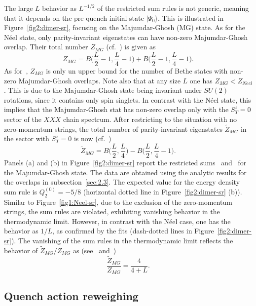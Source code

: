 \documentclass[11pt]{iopart}
\begin{document}
The large $L$ behavior as $L^{-1/2}$  of the restricted sum 
rules is not generic, meaning that it depends on the pre-quench initial state $|\Psi_0
\rangle$. This is illustrated in Figure~\ref{fig2:dimer-sr}, focusing on the 
Majumdar-Ghosh (MG) state. As for the N\'eel state, only parity-invariant eigenstates 
can have non-zero Majumdar-Ghosh overlap. Their total number $Z_{MG}$ (cf.~) 
is given as 
%
\begin{equation}
\label{mg1}
Z_{MG}=B\Big(\frac{L}{2}-1,\frac{L}{4}-1\Big)+B\Big(\frac{L}{2}-1,
\frac{L}{4}-1\Big). 
\end{equation}
%
As for~, $Z_{MG}$ is only un upper bound for the number of Bethe states with 
non-zero Majumdar-Ghosh overlaps. Note also that at any size $L$ one has $Z_{MG}<Z_{Neel}$. 
This is due to the Majumdar-Ghosh state being invariant under $SU(2)$ rotations, since it 
contains only spin singlets. In contrast with the N\'eel state, this implies that the 
Majumdar-Ghosh stat has non-zero overlap only with the $S^z_T=0$ sector of the $XXX$ chain 
spectrum. After restricting to the situation with no zero-momentum strings, the total number 
of parity-invariant eigenstates $\widetilde Z_{MG}$ in the sector with $S_T^z=0$ is now 
(cf.~)
%
\begin{equation}
\label{mg2}
\widetilde Z_{MG}=B\Big(\frac{L}{2},\frac{L}{4}\Big)-B\Big(\frac{L}{2},
\frac{L}{4}-1\Big). 
\end{equation}
%
Panels (a) and (b) in Figure~\ref{fig2:dimer-sr} report the restricted sums~ 
and~ for the Majumdar-Ghosh state. The data are obtained using the 
analytic results for the overlaps in subsection~\ref{sec:2.3}. The expected value for 
the energy density sum rule is $Q_2^{(0)}=-5/8$ (horizontal dotted line in 
Figure~\ref{fig2:dimer-sr} (b)). Similar to Figure~\ref{fig1:Neel-sr}, due to the exclusion 
of the zero-momentum strings, the sum rules are violated, exhibiting vanishing behavior in 
the thermodynamic limit. However, in contrast with the N\'eel case, one has the behavior 
as $1/L$, as confirmed by the fits (dash-dotted lines in Figure~\ref{fig2:dimer-sr}). 
The vanishing of the sum rules in the thermodynamic limit 
reflects the behavior of $\widetilde Z_{MG}/Z_{MG}$ as (see~ and~)
%
\begin{equation}
\frac{\widetilde Z_{MG}}{Z_{MG}}=\frac{4}{4+L}. 
\end{equation}
%

\subsection{Quench action reweighing}
\end{document}
